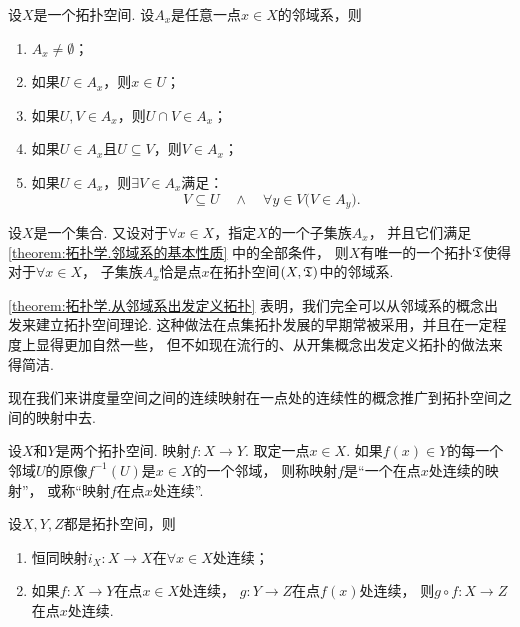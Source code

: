 \begin{theorem}\label{theorem:拓扑学.邻域系的基本性质}
设\(X\)是一个拓扑空间.
设\(A_x\)是任意一点\(x \in X\)的邻域系，则
\begin{enumerate}
	\item \(A_x \neq \emptyset\)；
	\item 如果\(U \in A_x\)，则\(x \in U\)；
	\item 如果\(U,V \in A_x\)，则\(U \cap V \in A_x\)；
	\item 如果\(U \in A_x\)且\(U \subseteq V\)，则\(V \in A_x\)；
	\item 如果\(U \in A_x\)，则\(\exists V \in A_x\)满足：\[
		V \subseteq U
		\quad\land\quad
		\forall y \in V \bigl( V \in A_y \bigr).
	\]
\end{enumerate}
\end{theorem}

\begin{theorem}\label{theorem:拓扑学.从邻域系出发定义拓扑}
设\(X\)是一个集合.
又设对于\(\forall x \in X\)，指定\(X\)的一个子集族\(A_x\)，
并且它们满足\cref{theorem:拓扑学.邻域系的基本性质} 中的全部条件，
则\(X\)有唯一的一个拓扑\(\mathfrak T\)使得对于\(\forall x \in X\)，
子集族\(A_x\)恰是点\(x\)在拓扑空间\((X,\mathfrak T)\)中的邻域系.
\end{theorem}

\cref{theorem:拓扑学.从邻域系出发定义拓扑}
表明，我们完全可以从邻域系的概念出发来建立拓扑空间理论.
这种做法在点集拓扑发展的早期常被采用，并且在一定程度上显得更加自然一些，
但不如现在流行的、从开集概念出发定义拓扑的做法来得简洁.

现在我们来讲度量空间之间的连续映射在一点处的连续性的概念推广到拓扑空间之间的映射中去.

\begin{definition}
设\(X\)和\(Y\)是两个拓扑空间.
映射\(f\colon X \to Y\).
取定一点\(x \in X\).
如果\(f(x) \in Y\)的每一个邻域\(U\)的原像\(f^{-1}(U)\)是\(x \in X\)的一个邻域，
则称映射\(f\)是“一个在点\(x\)处连续的映射”，
或称“映射\(f\)在点\(x\)处连续”.
\end{definition}

\begin{theorem}
设\(X,Y,Z\)都是拓扑空间，则
\begin{enumerate}
	\item 恒同映射\(i_X\colon X \to X\)在\(\forall x \in X\)处连续；
	\item 如果\(f\colon X \to Y\)在点\(x \in X\)处连续，
	\(g\colon Y \to Z\)在点\(f(x)\)处连续，
	则\(g \circ f\colon X \to Z\)在点\(x\)处连续.
\end{enumerate}
\end{theorem}

